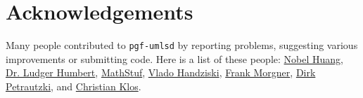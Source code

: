 \documentclass{article}
\begin{document}
\section{Acknowledgements}
Many people contributed to \texttt{pgf-umlsd} by reporting problems,
suggesting various improvements or submitting code. Here is a list of
these people:
\href{mailto:nobel1984@gmail.com}{Nobel Huang},
\href{mailto:humbert@uni-wuppertal.de}{Dr. Ludger Humbert},
\href{mailto:MathStuf@gmail.com}{MathStuf},
\href{mailto:vlado.handziski@gmail.com}{Vlado Handziski},
\href{mailto:frankmorgner@gmail.com}{Frank Morgner},
\href{mailto:petrautzki@hs-coburg.de}{Dirk Petrautzki},
and \href{mailto:christianklos@gmx.net}{Christian Klos}.
\end{document}
